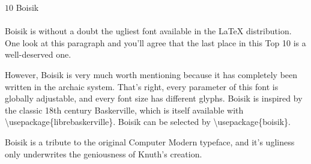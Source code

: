 \documentclass{article}
\begin{document}
\frenchspacing
\noindent
{\LARGE $10$ Boisik}~\\
~\\
Boisik is without a doubt the ugliest font available in the \LaTeX{}
distribution.  One look at this paragraph and you'll agree that the
last place in this Top 10 is a well-deserved one.

However, Boisik is very much worth mentioning because it has
completely been written in the archaic \MF{} system.  That's right,
every parameter of this font is globally adjustable, and every font
size has different glyphs.  Boisik is inspired by the classic 18th
century {\librebaskerville\small Baskerville}, which is itself
available with \textbackslash{}usepackage\{librebaskerville\}. Boisik
can be selected by \textbackslash{}usepackage\{boisik\}.

Boisik
is a tribute to the original Computer Modern typeface, and it's
ugliness only underwrites the geniousness of Knuth's creation.
\end{document}

